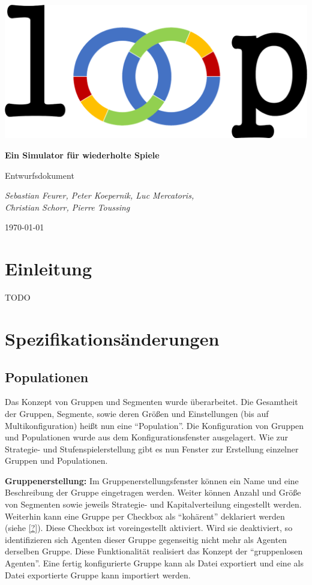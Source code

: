 \documentclass[parskip=full,11pt]{scrartcl}
\begin{document}
\begin{titlepage}
	\centering
	\vspace*{5cm}
	\includegraphics[width = 0.7\linewidth]{images/Logos/loop.png}\par
	{\huge\bfseries Ein Simulator für wiederholte Spiele\par}
	{\Large Entwurfsdokument\par}
	\vspace{2cm}
	{\Large\itshape Sebastian Feurer, Peter Koepernik, Luc Mercatoris,\\Christian Schorr, Pierre Toussing\par}
	\vfill
	{\large \today\par}
\end{titlepage}


\section{Einleitung}
TODO

\section{Spezifikationsänderungen}

\subsection{Populationen}
Das Konzept von Gruppen und Segmenten wurde überarbeitet. Die Gesamtheit der Gruppen, Segmente, sowie deren Größen und Einstellungen (bis auf Multikonfiguration) heißt nun eine \enquote{Population}. Die Konfiguration von Gruppen und Populationen wurde aus dem Konfigurationsfenster ausgelagert. Wie zur Strategie- und Stufenspielerstellung gibt es nun Fenster zur Erstellung einzelner Gruppen und Populationen.

\textbf{Gruppenerstellung:}
Im Gruppenerstellungsfenster können ein Name und eine Beschreibung der Gruppe eingetragen werden. Weiter können Anzahl und Größe von Segmenten sowie jeweils Strategie- und Kapitalverteilung eingestellt werden. Weiterhin kann eine Gruppe per Checkbox als \enquote{kohärent} deklariert werden (siehe \cref{?}). Diese Checkbox ist voreingestellt aktiviert. Wird sie deaktiviert, so identifizieren sich Agenten dieser Gruppe gegenseitig nicht mehr als Agenten derselben Gruppe. Diese Funktionalität realisiert das Konzept der \enquote{gruppenlosen Agenten}. Eine fertig konfigurierte Gruppe kann als Datei exportiert und eine als Datei exportierte Gruppe kann importiert werden.
\end{document}

